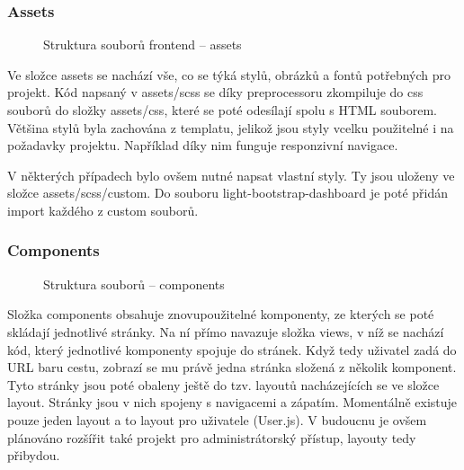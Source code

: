 \documentclass[a4paper,oneside,12pt]{report}
\begin{document}
\subsubsection{Assets}

\begin{figure}[h]
	\caption[Struktura souborů frontendu -- assets , vlastní tvorba]{Struktura souborů frontend -- assets}
	\label{fig:frontendStructureAssets}
\end{figure}
Ve složce assets se nachází vše, co se týká stylů, obrázků a fontů potřebných pro projekt.
Kód napsaný v assets/scss se díky preprocessoru zkompiluje do css souborů do složky assets/css, které se poté odesílají spolu s HTML souborem.
Většina stylů byla zachována z templatu, jelikož jsou styly vcelku použitelné i na požadavky projektu. Například díky nim funguje responzivní navigace.

V některých případech bylo ovšem nutné napsat vlastní styly.
Ty jsou uloženy ve složce assets/scss/custom.
Do souboru light-bootstrap-dashboard je poté přidán import každého z custom souborů.

\newpage
\subsubsection{Components}

\begin{figure}[h]
	\caption[Struktura souborů -- components, vlastní tvorba]{Struktura souborů -- components}
	\label{fig:frontendStructureComponentes}
\end{figure}

Složka components obsahuje znovupoužitelné komponenty, ze kterých se poté skládají jednotlivé stránky.
Na ní přímo navazuje složka views, v níž se nachází kód, který jednotlivé komponenty spojuje do stránek.
Když tedy uživatel zadá do URL baru cestu, zobrazí se mu právě jedna stránka složená z několik komponent.
Tyto stránky jsou poté obaleny ještě do tzv. layoutů nacházejících se ve složce layout.
Stránky jsou v nich spojeny s navigacemi a zápatím.
Momentálně existuje pouze jeden layout a to layout pro uživatele (User.js).
V budoucnu je ovšem plánováno rozšířit také projekt pro administrátorský přístup, layouty tedy přibydou.
\end{document}
